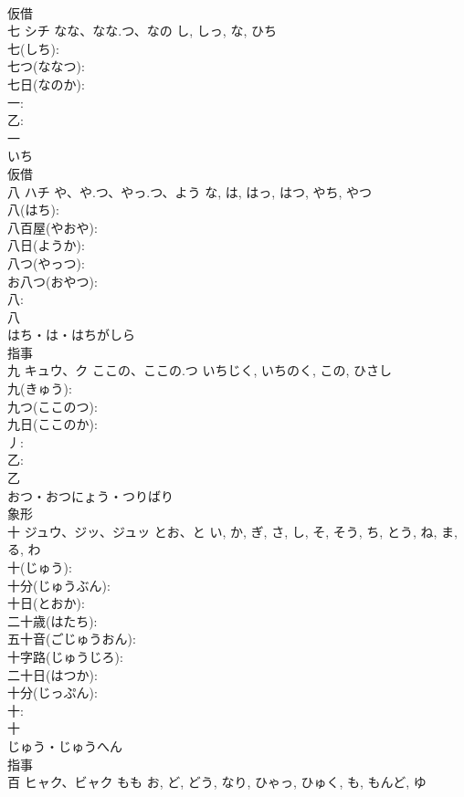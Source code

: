 \documentclass[8pt]{extreport}
\begin{document}
\begin{CJK}{UTF8}{min}
\\	仮借 
\\	七	シチ	なな、なな.つ、なの	し, しっ, な, ひち	
\\	七(しち): 
\\	七つ(ななつ): 
\\	七日(なのか): 
\\	一: 
\\	乙: 
\\	一	
\\	いち	
\\	仮借 
\\	八	ハチ	や、や.つ、やっ.つ、よう	な, は, はっ, はつ, やち, やつ	
\\	八(はち): 
\\	八百屋(やおや): 
\\	八日(ようか): 
\\	八つ(やっつ): 
\\	お八つ(おやつ): 
\\	八: 
\\	八	
\\	はち・は・はちがしら	
\\	指事 
\\	九	キュウ、ク	ここの、ここの.つ	いちじく, いちのく, この, ひさし	
\\	九(きゅう): 
\\	九つ(ここのつ): 
\\	九日(ここのか): 
\\	丿: 
\\	乙: 
\\	乙	
\\	おつ・おつにょう・つりばり	
\\	象形 
\\	十	ジュウ、ジッ、ジュッ	とお、と	い, か, ぎ, さ, し, そ, そう, ち, とう, ね, ま, る, わ	
\\	十(じゅう): 
\\	十分(じゅうぶん): 
\\	十日(とおか): 
\\	二十歳(はたち): 
\\	五十音(ごじゅうおん): 
\\	十字路(じゅうじろ): 
\\	二十日(はつか): 
\\	十分(じっぷん): 
\\	十: 
\\	十	
\\	じゅう・じゅうへん	
\\	指事 
\\	百	ヒャク、ビャク	もも	お, ど, どう, なり, ひゃっ, ひゅく, も, もんど, ゆ	

\end{CJK}
\end{document}
